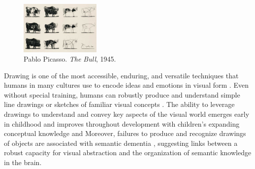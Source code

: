 \documentclass{article}
\begin{document}
\begin{figure}
    \centering
    \includegraphics[width= 0.35\textwidth]{figures/picasso_bulls.jpg}
    \caption{Pablo Picasso. \textit{The Bull}, 1945.}
    \label{fig:bulls}
\end{figure}

Drawing is one of the most accessible, enduring, and versatile techniques that humans in many cultures use to encode ideas and emotions in visual form \cite{hoffman2018dating, aubert2014pleistocene, gombrich1995story}. 
Even without special training, humans can robustly produce and understand simple line drawings or sketches of familiar visual concepts \cite{fan2018common, snodgrass1980standardized, jongejan2017quick}.
The ability to leverage drawings to understand and convey key aspects of the visual world emerges early in childhood \cite{luquet1927dessin, barrett1976symbolism, karmiloff1990constraints} and improves throughout development with children's expanding conceptual knowledge \cite{dillon2021rooms, long2021parallel, huey2022developmental} and
Moreover, failures to produce and recognize drawings of objects are associated with semantic dementia \cite{bozeat2003duck, rogers2007object}, suggesting links between a robust capacity for visual abstraction and the organization of semantic knowledge in the brain. 
\end{document}
